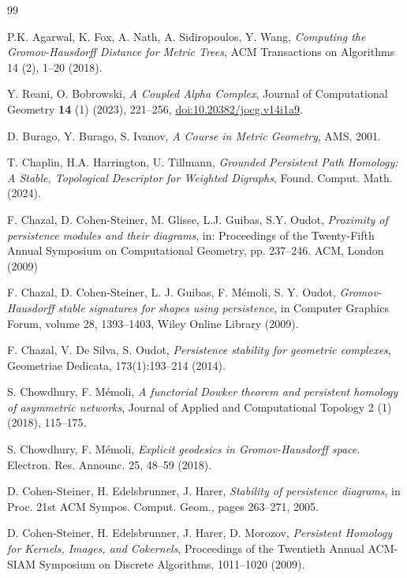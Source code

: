\documentclass[8pt,a4paper,oneside,english,english]{article}
\theoremstyle{plain}
\theoremstyle
{plain}
\theoremstyle{definition}
\begin{document}
\begin{thebibliography}{99}

P.K. Agarwal, K. Fox, A. Nath, A. Sidiropoulos, Y. Wang, {\em Computing the Gromov-Hausdorff Distance for Metric Trees}, ACM Transactions on Algorithms 14 (2), 1--20 (2018).

Y. Reani, O. Bobrowski, {\em A Coupled Alpha Complex}, Journal of Computational Geometry {\bf 14} (1) (2023), 221--256, \href{https://doi.org/10.20382/jocg.v14i1a9}{doi:10.20382/jocg.v14i1a9}.

D. Burago, Y. Burago, S. Ivanov, {\em A Course in Metric Geometry}, AMS, 2001.

T. Chaplin, H.A. Harrington, U. Tillmann, {\em Grounded Persistent Path Homology: A Stable, Topological Descriptor for Weighted Digraphs}, Found. Comput. Math. (2024).

F. Chazal, D. Cohen-Steiner, M. Glisse, L.J. Guibas, S.Y. Oudot, {\em Proximity of persistence modules and their diagrams}, in: Proceedings of the Twenty-Fifth Annual Symposium on Computational Geometry,
pp. 237--246. ACM, London (2009)

F. Chazal, D. Cohen-Steiner, L. J. Guibas, F. M\'emoli, S. Y. Oudot, {\em Gromov-Hausdorff stable signatures for shapes using persistence}, in Computer Graphics Forum, volume 28, 1393--1403, Wiley Online Library (2009). 

F. Chazal, V. De Silva, S. Oudot, {\em Persistence stability for geometric complexes}, Geometriae Dedicata, 173(1):193--214 (2014).

S. Chowdhury, F. M\'emoli, {\em A functorial Dowker theorem and persistent homology of asymmetric networks}, Journal of Applied and Computational Topology 2 (1) (2018), 115--175.

S. Chowdhury, F. M\'emoli, {\em Explicit geodesics in Gromov-Hausdorff space}. Electron. Res. Announc. 25, 48--59 (2018). 

D. Cohen-Steiner, H. Edelsbrunner, J. Harer, {\em Stability of persistence diagrams}, in Proc.
21st ACM Sympos. Comput. Geom., pages 263--271, 2005.

D. Cohen-Steiner, H. Edelsbrunner, J. Harer, D. Morozov, {\em Persistent Homology for Kernels, Images, and Cokernels}, Proceedings of the Twentieth Annual ACM-SIAM Symposium on Discrete Algorithms, 1011--1020 (2009).


\end{thebibliography}
\end{document}
